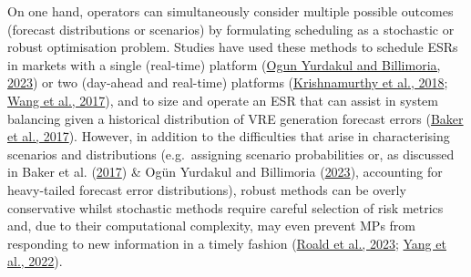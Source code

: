 \documentclass[12pt,a4paper,]{report}
\begin{document}
On one hand, operators can simultaneously consider multiple possible
outcomes (forecast distributions or scenarios) by formulating scheduling
as a stochastic or robust optimisation problem. Studies have used these
methods to schedule ESRs in markets with a single (real-time) platform
(\protect\hyperlink{ref-yurdakulRiskAverseSelfSchedulingStorage2023}{Ogun
Yurdakul and Billimoria, 2023}) or two (day-ahead and real-time)
platforms
(\protect\hyperlink{ref-krishnamurthyEnergyStorageArbitrage2018}{Krishnamurthy
et al., 2018};
\protect\hyperlink{ref-wangOptimalSchedulingEnergy2017}{Wang et al.,
2017}), and to size and operate an ESR that can assist in system
balancing given a historical distribution of VRE generation forecast
errors (\protect\hyperlink{ref-bakerEnergyStorageSizing2017}{Baker et
al., 2017}). However, in addition to the difficulties that arise in
characterising scenarios and distributions (e.g.~assigning scenario
probabilities or, as discussed in Baker et al.
(\protect\hyperlink{ref-bakerEnergyStorageSizing2017}{2017}) \& Ogün
Yurdakul and Billimoria
(\protect\hyperlink{ref-yurdakulOnlineCompanionRiskAverse2023a}{2023}),
accounting for heavy-tailed forecast error distributions), robust
methods can be overly conservative whilst stochastic methods require
careful selection of risk metrics and, due to their computational
complexity, may even prevent MPs from responding to new information in a
timely fashion
(\protect\hyperlink{ref-roaldPowerSystemsOptimization2023}{Roald et al.,
2023}; \protect\hyperlink{ref-yangModellingOptimalEnergy2022}{Yang et
al., 2022}).
\end{document}
